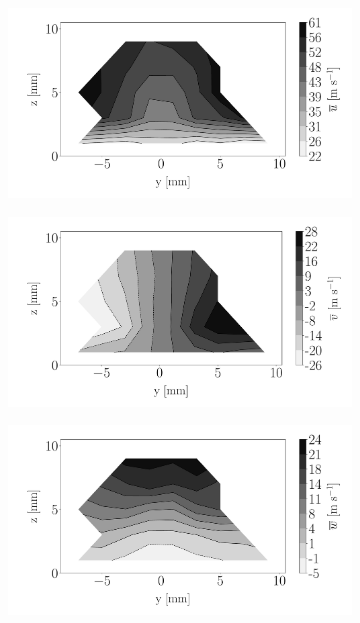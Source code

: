 \begin{figure}[h!]
\begin{subfigure}[b]{0.3\textwidth}
	\centering
   \includegraphics[scale=\scaleSLIJICF]{./part2_developments/figures_ch5_resolved_JICF/injectors_SLI/uG75_dx20_x15_ux_mean_map}
\end{subfigure}
   \hspace{0.17in}
\begin{subfigure}[b]{0.3\textwidth}
	\centering
   \includegraphics[scale=\scaleSLIJICF]{./part2_developments/figures_ch5_resolved_JICF/injectors_SLI/uG75_dx20_x15_uy_mean_map}
\end{subfigure}
   \hspace{0.17in}
\begin{subfigure}[b]{0.3\textwidth}
	\centering
   \includegraphics[scale=\scaleSLIJICF]{./part2_developments/figures_ch5_resolved_JICF/injectors_SLI/uG75_dx20_x15_uz_mean_map}

\end{subfigure}
\end{figure}

